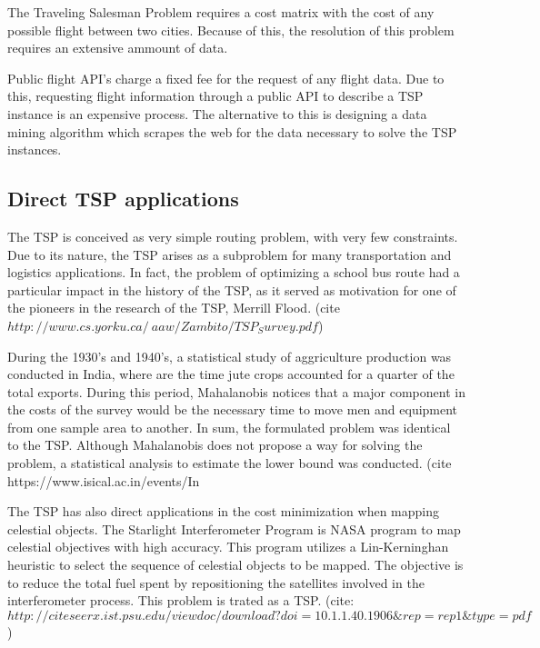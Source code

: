 The Traveling Salesman Problem requires a cost matrix with the
cost of any possible flight between two cities. Because of this,
the resolution of this problem requires an extensive ammount of data.

Public flight API's charge a fixed fee for the request of any flight data.
Due to this, requesting flight information through a public API to describe
a TSP instance is an expensive process. The alternative to this is designing
a data mining algorithm which scrapes the web for the data necessary to solve
the TSP instances.


\subsection{Direct TSP applications}

The TSP is conceived as very simple routing problem, with very few constraints.
Due to its nature, the TSP arises as a subproblem for many transportation
and logistics applications. In fact, the problem of optimizing a school bus route 
had a particular impact in the history of the TSP, as it served as motivation 
for one of the pioneers in the research of the TSP, Merrill Flood.  
(cite $http://www.cs.yorku.ca/~aaw/Zambito/TSP_Survey.pdf$)
 
 During the 1930's and 1940's, a statistical study of aggriculture production 
 was conducted in India, where are the time jute crops accounted for a quarter of the 
 total exports. During this period, Mahalanobis notices that a major component
 in the costs of the survey would be the necessary time to move men and equipment 
 from one sample area to another. In sum, the formulated problem was identical to the TSP.
 Although Mahalanobis does not propose a way for solving the problem,
 a statistical analysis to estimate the lower bound was conducted. 
(cite https://www.isical.ac.in/events/In%

The TSP has also direct applications in the cost minimization when mapping celestial objects.
The Starlight Interferometer Program is NASA program to map celestial objectives
with high accuracy. This program utilizes a Lin-Kerninghan heuristic to select 
the sequence of celestial objects to be mapped. The objective is to  reduce 
the total fuel spent by repositioning the satellites involved in the interferometer process.
This problem is trated as a TSP. 
(cite: $http://citeseerx.ist.psu.edu/viewdoc/download?doi=10.1.1.40.1906\&rep=rep1\&type=pdf$)


